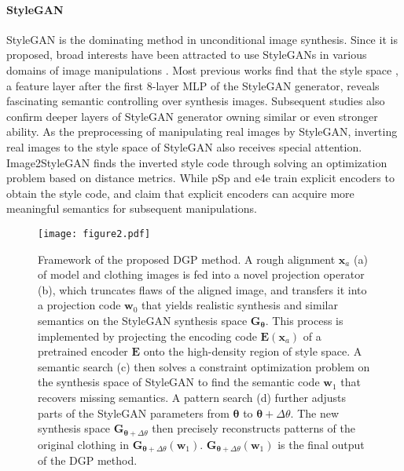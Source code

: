 \documentclass[10pt,twocolumn,letterpaper]{article}
\newcommand{\w}{\bm{w}}
\begin{document}
\paragraph{StyleGAN} StyleGAN \cite{karras2019style,karras2018progressive,karras2020analyzing} is the dominating method in unconditional image synthesis. Since it is proposed, broad interests have been attracted to use StyleGANs in various domains of image manipulations \cite{tewari2020stylerig,wu2021stylespace,shen2020interpreting,yang2020towards}. Most previous works find that the style space \cite{shen2020interpreting,tewari2020stylerig}, a feature layer after the first 8-layer MLP of the StyleGAN generator, reveals fascinating semantic controlling over synthesis images. Subsequent studies \cite{wu2021stylespace,richardson2021encoding} also confirm deeper layers of StyleGAN generator owning similar or even stronger ability. As the preprocessing of manipulating real images by StyleGAN, inverting real images to the style space of StyleGAN also receives special attention. Image2StyleGAN \cite{abdal2019image2stylegan,abdal2020image2stylegan++} finds the inverted style code through solving an optimization problem based on distance metrics. While pSp \cite{richardson2021encoding} and e4e \cite{tov2021designing} train explicit encoders to obtain the style code, and claim that explicit encoders can acquire more meaningful semantics for subsequent manipulations.
\begin{figure*}[ht]
    \centering
    \texttt{[image: figure2.pdf]}\caption{Framework of the proposed DGP method. A rough alignment $\bm{x}_a$ (a) of model and clothing images is fed into a novel projection operator (b), which truncates flaws of the aligned image, and transfers it into a projection code $\bm{w}_0$ that yields realistic synthesis and similar semantics on the StyleGAN synthesis space $\bm{G}_{\bm{\theta}}$. This process is implemented by projecting the encoding code $\bm{E}(\bm{x}_a)$ of a pretrained encoder $\bm{E}$ onto the high-density region of style space. A semantic search (c) then solves a constraint optimization problem on the synthesis space of StyleGAN to find the semantic code $\w_1$ that recovers missing semantics. A pattern search (d) further adjusts parts of the StyleGAN parameters from $\bm{\theta}$ to $\bm{\theta}+\Delta\theta$. The new synthesis space $\bm{G}_{\bm{\theta}+\Delta\theta}$ then precisely reconstructs patterns of the original clothing in $\bm{G}_{\bm{\theta}+\Delta\theta}(\w_1)$. $\bm{G}_{\bm{\theta}+\Delta\theta}(\w_1)$ is the final output of the DGP method.}
    \label{fig:frame}\end{figure*}
\end{document}
